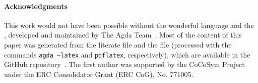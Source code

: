 \paragraph*{Acknowledgments}
This work would not have been possible without the wonderful \agda language and the
\agdastdlib, developed and
maintained by The Agda Team~\cite{agdastdlib}.
Most of the content of this paper was generated from the literate \agda file \HSPlagda and the \LaTeXe file \agdahsp (processed with the commands
\texttt{agda --latex} and \texttt{pdflatex}, respectively), which are available in the \agdaalgebras GitHub repository~\cite{ualib_v2.0.0}.
The first author was supported by the CoCoSym Project under the ERC Consolidator Grant (ERC CoG), No. 771005.




